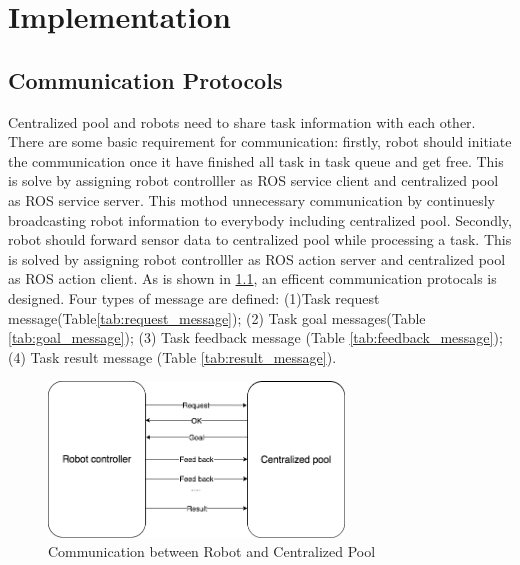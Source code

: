 \chapter{Implementation}


\section{Communication Protocols}


Centralized pool and robots need to share task information with each other. There are some basic requirement for communication: firstly,
robot should initiate the communication once it have finished all task in task queue and get free. This is solve by assigning robot controlller as ROS service client and centralized pool as ROS service server.
This mothod unnecessary communication by continuesly broadcasting robot information to everybody including centralized pool.
Secondly, robot should forward sensor data to centralized pool while processing a task. This is solved by assigning robot controlller as ROS action server and centralized pool as ROS action client.
As is shown in \ref{fig:comminication}, an efficent communication protocals is designed. Four types of message are defined: 
(1)Task request message(Table\ref{tab:request_message}); (2) Task goal messages(Table \ref{tab:goal_message}); (3) Task feedback message (Table \ref{tab:feedback_message}); (4) Task result message (Table \ref{tab:result_message}). 

\begin{figure}[htbp]
    \centering
    \includegraphics[width = 0.7\textwidth]{content/images/ch4/robot_pool_comminication.drawio.png}
    \caption{Communication between Robot and Centralized Pool}
    \label{fig:comminication}
\end{figure}

